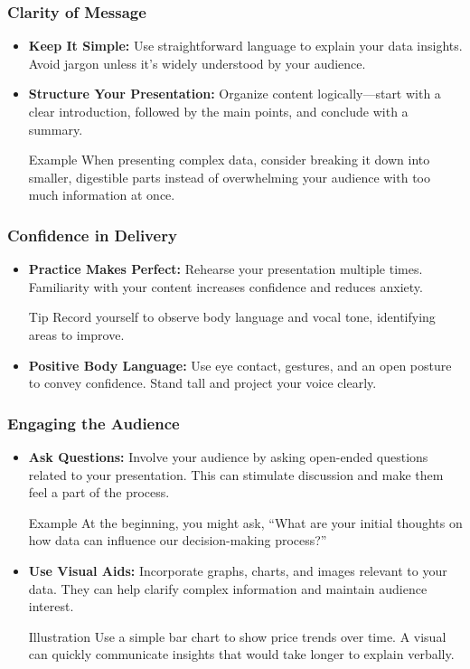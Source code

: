 \documentclass[aspectratio=169]{beamer}
\begin{document}
\begin{frame}[fragile]
    \frametitle{Clarity of Message}
    \begin{itemize}
        \item \textbf{Keep It Simple:} Use straightforward language to explain your data insights. Avoid jargon unless it's widely understood by your audience.
        \item \textbf{Structure Your Presentation:} Organize content logically—start with a clear introduction, followed by the main points, and conclude with a summary.
        \begin{block}{Example}
            When presenting complex data, consider breaking it down into smaller, digestible parts instead of overwhelming your audience with too much information at once.
        \end{block}
    \end{itemize}
\end{frame}

\begin{frame}[fragile]
    \frametitle{Confidence in Delivery}
    \begin{itemize}
        \item \textbf{Practice Makes Perfect:} Rehearse your presentation multiple times. Familiarity with your content increases confidence and reduces anxiety.
        \begin{block}{Tip}
            Record yourself to observe body language and vocal tone, identifying areas to improve.
        \end{block}
        \item \textbf{Positive Body Language:} Use eye contact, gestures, and an open posture to convey confidence. Stand tall and project your voice clearly.
    \end{itemize}
\end{frame}

\begin{frame}[fragile]
    \frametitle{Engaging the Audience}
    \begin{itemize}
        \item \textbf{Ask Questions:} Involve your audience by asking open-ended questions related to your presentation. This can stimulate discussion and make them feel a part of the process.
        \begin{block}{Example}
            At the beginning, you might ask, “What are your initial thoughts on how data can influence our decision-making process?”
        \end{block}
        \item \textbf{Use Visual Aids:} Incorporate graphs, charts, and images relevant to your data. They can help clarify complex information and maintain audience interest.
        \begin{block}{Illustration}
            Use a simple bar chart to show price trends over time. A visual can quickly communicate insights that would take longer to explain verbally.
        \end{block}
    \end{itemize}
\end{frame}
\end{document}
